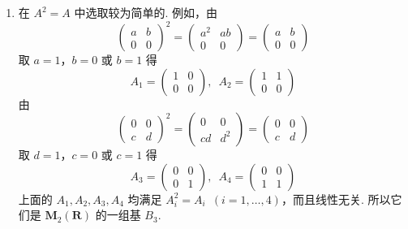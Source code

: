 \documentclass[12pt,fontset=fandol]{ctexart}
\begin{document}
\begin{solve}
\begin{enumerate}
                \item 在 $ A^2 = A $ 中选取较为简单的. 例如，由
                      \[ \begin{pmatrix} a & b \\ 0 & 0 \end{pmatrix}^2 = \begin{pmatrix} a^2 & ab \\ 0 & 0 \end{pmatrix} = \begin{pmatrix} a & b \\ 0 & 0 \end{pmatrix} \]
                      取 $ a = 1 $，$ b = 0 $ 或 $ b = 1 $ 得
                      \[ A_1 = \begin{pmatrix} 1 & 0 \\ 0 & 0 \end{pmatrix},\enspace A_2 = \begin{pmatrix} 1 & 1 \\ 0 & 0 \end{pmatrix} \]
                      由
                      \[ \begin{pmatrix} 0 & 0 \\ c & d \end{pmatrix}^2 = \begin{pmatrix} 0 & 0 \\ cd & d^2 \end{pmatrix} = \begin{pmatrix} 0 & 0 \\ c & d \end{pmatrix} \]
                      取 $ d = 1 $，$ c = 0 $ 或 $ c = 1 $ 得
                      \[ A_3 = \begin{pmatrix} 0 & 0 \\ 0 & 1 \end{pmatrix},\enspace A_4 = \begin{pmatrix} 0 & 0 \\ 1 & 1 \end{pmatrix} \]
                      上面的 $ A_1, A_2, A_3, A_4 $ 均满足 $ A_i^2 = A_i \enspace(i = 1, \ldots, 4) $，而且线性无关. 所以它们是 $ \mathbf{M}_2(\mathbf{R}) $ 的一组基 $ B_3 $.


\end{enumerate}
\end{solve}
\end{document}
